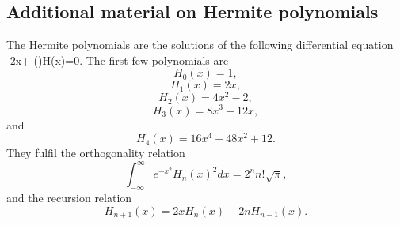 \begin{prob}
\section*{Additional material on Hermite polynomials}

The Hermite polynomials are the solutions of the following differential
equation
\be
   -2x+
       ()H(x)=0.
   \label{eq:hermite}
\ee
The first few polynomials are
\[
   H_0(x)=1,
\]
\[
    H_1(x)=2x,
\]
\[
    H_2(x)=4x^2-2,
\]
\[
    H_3(x)=8x^3-12x,
\]
and
\[
    H_4(x)=16x^4-48x^2+12.
\]
They fulfil the orthogonality relation
\[
  \int_{-\infty}^{\infty}e^{-x^2}H_n(x)^2dx=2^nn!\sqrt{\pi},
\]
and the recursion relation
\[
  H_{n+1}(x)=2xH_{n}(x)-2nH_{n-1}(x).
\]
\end{prob}
